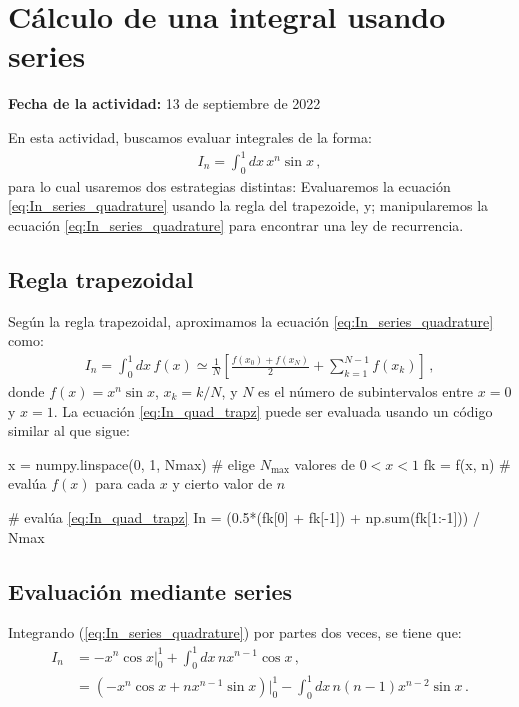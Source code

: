 \documentclass[../portafolio.tex]{subfiles}
\begin{document}
\chapter{Cálculo de una integral usando series} 

\hfill \textbf{Fecha de la actividad:} 13 de septiembre de 2022

\medskip

En esta actividad, buscamos evaluar integrales de la forma:
\begin{align}
  \label{eq:In_series_quadrature}
  I_n = \int_0^1 dx\, x^n \sin x \,,
\end{align}
%
para lo cual usaremos dos estrategias distintas: Evaluaremos la ecuación \eqref{eq:In_series_quadrature} usando la regla del trapezoide, y; manipularemos la ecuación \eqref{eq:In_series_quadrature} para encontrar una ley de recurrencia.

\section{Regla trapezoidal}
Según la regla trapezoidal, aproximamos la ecuación \eqref{eq:In_series_quadrature} como:
\begin{align}
  \label{eq:In_quad_trapz}
  I_n = \int_0^1 dx\,f(x) \simeq \frac{1}{N} \left[ \frac{f(x_0) + f(x_N)}{2} + \sum_{k=1}^{N-1} f(x_k)  \right] \,,
\end{align}
%
donde $f(x)=x^n \sin x$, $x_k=k/N$, y $N$ es el número de subintervalos entre $x=0$ y $x=1$. La ecuación \eqref{eq:In_quad_trapz} puede ser evaluada usando un código similar al que sigue: 
\begin{pythoncode}
  x = numpy.linspace(0, 1, Nmax)   # elige $N_\text{max}$ valores de $0<x<1$
  fk = f(x, n)                  # evalúa $f(x)$ para cada $x$ y cierto valor de $n$
  
  # evalúa \eqref{eq:In_quad_trapz}
  In = (0.5*(fk[0] + fk[-1]) + np.sum(fk[1:-1])) / Nmax
\end{pythoncode}

\section{Evaluación mediante series}
Integrando (\ref{eq:In_series_quadrature}) por partes dos veces, se tiene que:
\begin{align*}
  I_n
  &= -x^n \cos x\Bigg|_0^1 + \int_0^1 dx\, n x^{n-1} \cos x  \,, \\
  &= (-x^n \cos x + n x^{n-1} \sin x) \Bigg|_0^1 - \int_0^1 dx\, n (n-1) x^{n-2} \sin x  \,.
\end{align*}
\end{document}
